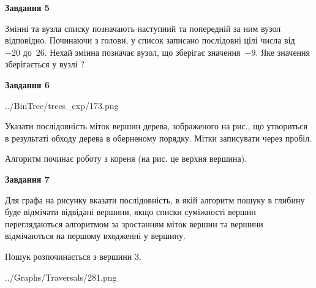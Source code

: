 \documentclass[12pt, ukrainian]{article}
\begin{document}
{\begin {large}
{\begin {center}\textbf{Завдання 5}\end {center}}\par
Змінні  та  вузла списку позначають наступний та попередній за ним вузол відповідно. Починаючи з голови, у список записано послідовні цілі числа від~$-20$ до~$26$. Нехай змінна  позначає вузол, що зберігає значення~$-9$.
Яке значення зберігається у вузлі  ?\par
\newpage

{\begin {center}\textbf{Завдання 6}\end {center}}\par

\begin{center}
	{../BinTree/trees_exp/173.png}
\end{center}
Указати послідовність міток вершин дерева, зображеного на рис., що утвориться в результаті обходу дерева в оберненому порядку. Мітки записувати через пробіл.\par Алгоритм починає роботу з кореня (на рис. це верхня вершина).\par
\newpage

{\begin {center}\textbf{Завдання 7}\end {center}}\par
Для графа на рисунку вказати послідовність, в якій алгоритм пошуку в глибину буде відмічати відвідані вершини, якщо списки суміжності вершин переглядаються алгоритмом за зростанням міток вершин та вершини відмічаються на першому вход\-женні у вершину.\par
Пошук розпочинається з вершини 3.\par

\begin{center}
	{../Graphs/Traversals/281.png}
\end{center}\par
\newpage


\end{large}}
\end{document}
